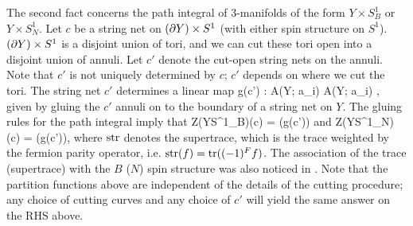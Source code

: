 The second fact concerns the path integral of 3-manifolds of the form $Y\times S^1_B$ or $Y\times S^1_N$.
Let $c$ be a string net on $(\partial Y)\times S^1$ (with either spin structure on $S^1$).
$(\partial Y)\times S^1$ is a disjoint union of tori, and we can cut these tori open into a disjoint union of annuli.
Let $c'$ denote the cut-open string nets on the annuli.
Note that $c'$ is not uniquely determined by $c$; $c'$ depends on where we cut the tori.
The string net $c'$ determines a linear map
\be
	g(c') : A(Y; a_i) \to A(Y; a_i) ,
\ee
given by gluing the $c'$ annuli on to the boundary of a string net on $Y$.
The gluing rules for the path integral imply that
\be
\label{bounding_trace}
	Z(Y\times S^1_B)(c) = \tr(g(c'))
\ee
and
\be
\label{nonbounding_trace}
	Z(Y\times S^1_N)(c) = \str(g(c')),
\ee
where $\text{str}$ denotes the supertrace, which is the trace weighted by the fermion parity operator, i.e. $\text{str}(f) = \text{tr}((-1)^F f)$.
The association of the trace (supertrace) with the $B$ ($N$) spin structure was 
also noticed in \cite{turzillo2016}. 
Note that the partition functions above are independent of the details of the cutting procedure;
any choice of cutting curves and any choice of $c'$ will yield the same answer on the RHS above.



